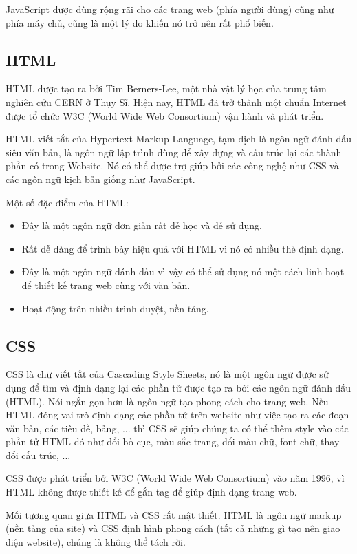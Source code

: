 JavaScript được dùng rộng rãi cho các trang web (phía người dùng)
cũng như phía máy chủ, cũng là một lý do khiến nó trở nên rất phổ biến.

\subsection{HTML}
HTML được tạo ra bởi Tim Berners-Lee, một nhà vật lý học của
trung tâm nghiên cứu CERN ở Thụy Sĩ. Hiện nay, HTML đã trở thành một
chuẩn Internet được tổ chức W3C (World Wide Web Consortium) vận hành
và phát triển.

HTML viết tắt của Hypertext Markup Language, tạm dịch là ngôn ngữ
đánh dấu siêu văn bản, là ngôn ngữ lập trình dùng để xây dựng và
cấu trúc lại các thành phần có trong Website. Nó có thể được trợ giúp
bởi các công nghệ như CSS và các ngôn ngữ kịch bản giống như JavaScript.

Một số đặc điểm của HTML:

\begin{itemize}
    \item Đây là một ngôn ngữ đơn giản rất dễ học và dễ sử dụng.
    \item Rất dễ dàng để trình bày hiệu quả với HTML vì nó có nhiều
    thẻ định dạng.
    \item Đây là một ngôn ngữ đánh dấu vì vậy có thể sử dụng nó một cách
    linh hoạt để thiết kế trang web cùng với văn bản.
    \item Hoạt động trên nhiều trình duyệt, nền tảng.
\end{itemize}

\subsection{CSS}
CSS là chữ viết tắt của Cascading Style Sheets, nó là một ngôn ngữ
được sử dụng để tìm và định dạng lại các phần tử được tạo ra bởi các
ngôn ngữ đánh dấu (HTML). Nói ngắn gọn hơn là ngôn ngữ tạo phong cách
cho trang web. Nếu HTML đóng vai trò định dạng các phần tử trên
website như việc tạo ra các đoạn văn bản, các tiêu đề, bảng, ... thì
CSS sẽ giúp chúng ta có thể thêm style vào các phần tử HTML đó như
đổi bố cục, màu sắc trang, đổi màu chữ, font chữ, thay đổi cấu trúc, ...

CSS được phát triển bởi W3C (World Wide Web Consortium) vào năm 1996,
vì HTML không được thiết kế để gắn tag để giúp định dạng trang web.

Mối tương quan giữa HTML và CSS rất mật thiết. HTML là ngôn ngữ markup
(nền tảng của site) và CSS định hình phong cách (tất cả những gì tạo
nên giao diện website), chúng là không thể tách rời.

